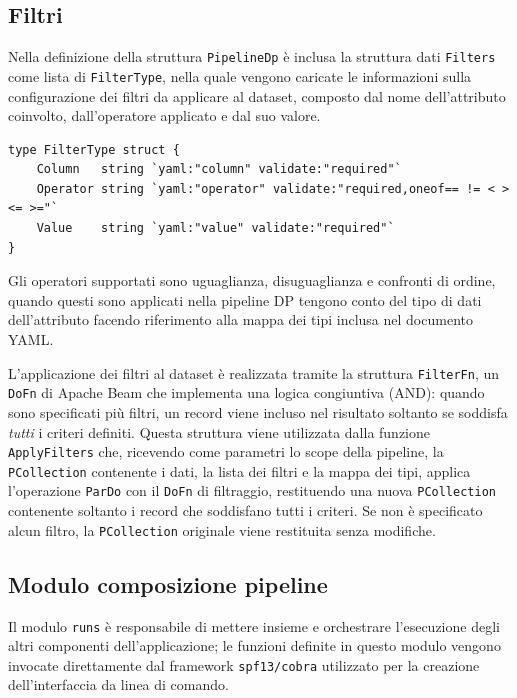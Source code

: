 \subsection{Filtri}

Nella definizione della struttura \texttt{PipelineDp} è inclusa la struttura dati \texttt{Filters} come lista di \texttt{FilterType}, nella quale vengono caricate le informazioni sulla configurazione dei filtri da applicare al dataset, composto dal nome dell'attributo coinvolto, dall'operatore applicato e dal suo valore.
\begin{verbatim}
type FilterType struct {
	Column   string `yaml:"column" validate:"required"`
	Operator string `yaml:"operator" validate:"required,oneof== != < > <= >="`
	Value    string `yaml:"value" validate:"required"`
}
\end{verbatim}
Gli operatori supportati sono uguaglianza, disuguaglianza e confronti di ordine, quando questi sono applicati nella pipeline DP tengono conto del tipo di dati dell'attributo facendo riferimento alla mappa dei tipi inclusa nel documento YAML.

L'applicazione dei filtri al dataset è realizzata tramite la struttura \texttt{FilterFn}, un \texttt{DoFn} di Apache Beam che implementa una logica congiuntiva (AND): quando sono specificati più filtri, un record viene incluso nel risultato soltanto se soddisfa \textit{tutti} i criteri definiti. Questa struttura viene utilizzata dalla funzione \texttt{ApplyFilters} che, ricevendo come parametri lo scope della pipeline, la \texttt{PCollection} contenente i dati, la lista dei filtri e la mappa dei tipi, applica l'operazione \texttt{ParDo} con il \texttt{DoFn} di filtraggio, restituendo una nuova \texttt{PCollection} contenente soltanto i record che soddisfano tutti i criteri. Se non è specificato alcun filtro, la \texttt{PCollection} originale viene restituita senza modifiche.

\subsection{Modulo composizione pipeline}
Il modulo \texttt{runs} è responsabile di mettere insieme e orchestrare l'esecuzione degli altri componenti dell'applicazione; le funzioni definite in questo modulo vengono invocate direttamente dal framework \texttt{spf13/cobra} utilizzato per la creazione dell'interfaccia da linea di comando.

